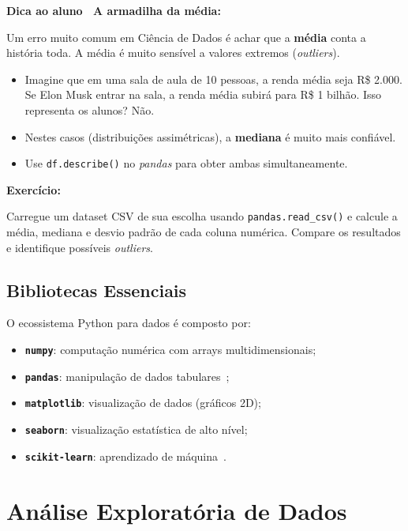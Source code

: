 \documentclass[
    12pt,
    oneside,
    a4paper,
    english,
    brazilian
    ]{abntex2}
\numberwithin{equation}{chapter}
\newenvironment{dica}{%
    \par\medskip
    \color{blue!60!black}\small\itshape
}{%
    \par\medskip
}
\newenvironment{exercicio}{%
    \par\medskip
    \color{teal!80!black}\small
    \noindent\textbf{Exercício: }\ignorespaces
}{%
    \par\medskip
}
\begin{document}
\begin{dica}
\noindent\textbf{Dica ao aluno \textemdash\ A armadilha da média:}

Um erro muito comum em Ciência de Dados é achar que a \textbf{média} conta a história toda. A média é muito sensível a valores extremos (\textit{outliers}).
\begin{itemize}
    \item Imagine que em uma sala de aula de 10 pessoas, a renda média seja R\$ 2.000. Se Elon Musk entrar na sala, a renda média subirá para R\$ 1 bilhão. Isso representa os alunos? Não.
    \item Nestes casos (distribuições assimétricas), a \textbf{mediana} é muito mais confiável.
    \item Use \texttt{df.describe()} no \textit{pandas} para obter ambas simultaneamente.
\end{itemize}
\end{dica}

\begin{exercicio}
Carregue um dataset CSV de sua escolha usando \texttt{pandas.read\_csv()} e calcule a média, mediana e desvio padrão de cada coluna numérica. Compare os resultados e identifique possíveis \textit{outliers}.
\end{exercicio}

\section{Bibliotecas Essenciais}

O ecossistema Python para dados é composto por:
\begin{itemize}
    \item \textbf{\texttt{numpy}}: computação numérica com arrays multidimensionais;
    \item \textbf{\texttt{pandas}}: manipulação de dados tabulares~\cite{pandas2023};
    \item \textbf{\texttt{matplotlib}}: visualização de dados (gráficos 2D);
    \item \textbf{\texttt{seaborn}}: visualização estatística de alto nível;
    \item \textbf{\texttt{scikit-learn}}: aprendizado de máquina~\cite{scikit2023}.
\end{itemize}

\chapter{Análise Exploratória de Dados}
\end{document}
